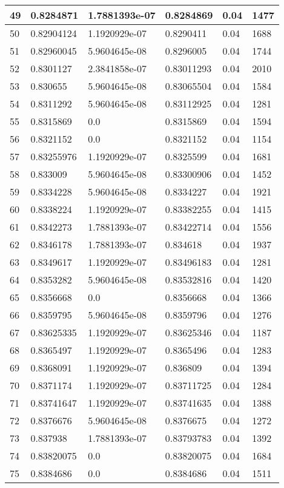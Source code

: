 \begin{longtable}{|l|l|l|l|l|l|}
49 & 0.8284871 & 1.7881393e-07 & 0.8284869 & 0.04 & 1477 \\ \hline 
50 & 0.82904124 & 1.1920929e-07 & 0.8290411 & 0.04 & 1688 \\ \hline 
51 & 0.82960045 & 5.9604645e-08 & 0.8296005 & 0.04 & 1744 \\ \hline 
52 & 0.8301127 & 2.3841858e-07 & 0.83011293 & 0.04 & 2010 \\ \hline 
53 & 0.830655 & 5.9604645e-08 & 0.83065504 & 0.04 & 1584 \\ \hline 
54 & 0.8311292 & 5.9604645e-08 & 0.83112925 & 0.04 & 1281 \\ \hline 
55 & 0.8315869 & 0.0 & 0.8315869 & 0.04 & 1594 \\ \hline 
56 & 0.8321152 & 0.0 & 0.8321152 & 0.04 & 1154 \\ \hline 
57 & 0.83255976 & 1.1920929e-07 & 0.8325599 & 0.04 & 1681 \\ \hline 
58 & 0.833009 & 5.9604645e-08 & 0.83300906 & 0.04 & 1452 \\ \hline 
59 & 0.8334228 & 5.9604645e-08 & 0.8334227 & 0.04 & 1921 \\ \hline 
60 & 0.8338224 & 1.1920929e-07 & 0.83382255 & 0.04 & 1415 \\ \hline 
61 & 0.8342273 & 1.7881393e-07 & 0.83422714 & 0.04 & 1556 \\ \hline 
62 & 0.8346178 & 1.7881393e-07 & 0.834618 & 0.04 & 1937 \\ \hline 
63 & 0.8349617 & 1.1920929e-07 & 0.83496183 & 0.04 & 1281 \\ \hline 
64 & 0.8353282 & 5.9604645e-08 & 0.83532816 & 0.04 & 1420 \\ \hline 
65 & 0.8356668 & 0.0 & 0.8356668 & 0.04 & 1366 \\ \hline 
66 & 0.8359795 & 5.9604645e-08 & 0.8359796 & 0.04 & 1276 \\ \hline 
67 & 0.83625335 & 1.1920929e-07 & 0.83625346 & 0.04 & 1187 \\ \hline 
68 & 0.8365497 & 1.1920929e-07 & 0.8365496 & 0.04 & 1283 \\ \hline 
69 & 0.8368091 & 1.1920929e-07 & 0.836809 & 0.04 & 1394 \\ \hline 
70 & 0.8371174 & 1.1920929e-07 & 0.83711725 & 0.04 & 1284 \\ \hline 
71 & 0.83741647 & 1.1920929e-07 & 0.83741635 & 0.04 & 1388 \\ \hline 
72 & 0.8376676 & 5.9604645e-08 & 0.8376675 & 0.04 & 1272 \\ \hline 
73 & 0.837938 & 1.7881393e-07 & 0.83793783 & 0.04 & 1392 \\ \hline 
74 & 0.83820075 & 0.0 & 0.83820075 & 0.04 & 1684 \\ \hline 
75 & 0.8384686 & 0.0 & 0.8384686 & 0.04 & 1511 \\ \hline 
\end{longtable}